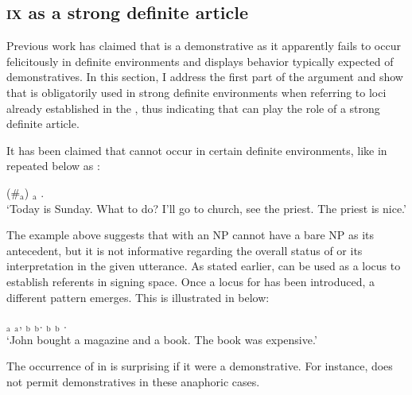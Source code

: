 \documentclass[output=paper,
modfonts
]{langscibook}
\begin{document}
\subsection{\textsc{ix} as a strong definite article}

Previous work \citep{KoulidobrovaLilloMartin2016} has claimed that  is a demonstrative as it apparently fails to occur felicitously in definite environments and displays behavior typically expected of demonstratives. In this section, I address the first part of the argument and show that  is obligatorily used in strong definite environments when referring to loci already established in the , thus indicating that  can play the role of a strong definite article. 

It has been claimed that  cannot occur in certain definite environments, like in  repeated below as :

\begin{exe} 
\ex \label{ex:irani:20}  (\#$_\text{a}$) $_\text{a}$ . \\
`Today is Sunday. What to do? I’ll go to church, see the priest. The priest is nice.’ \citep[adapted from][234]{KoulidobrovaLilloMartin2016}
\end{exe} 

The example above suggests that  with an NP cannot have a bare NP as its antecedent, but it is not informative regarding the overall status of  or its interpretation in the given utterance. As stated earlier,  can be used as a locus to establish referents in signing space. Once a locus for  has been introduced, a different pattern emerges. This is illustrated in  below: 

\begin{exe}
\ex \label{ex:irani:21} $_\text{a}$ $_\text{a}$, $_\text{b}$ $_\text{b}$. $_\text{b}$ $_\text{b}$ .\\
`John bought a magazine and a book. The book was expensive.'
\end{exe}

The occurrence of  in  is surprising if it were a demonstrative. For instance,  does not permit demonstratives in these anaphoric cases.
\end{document}
